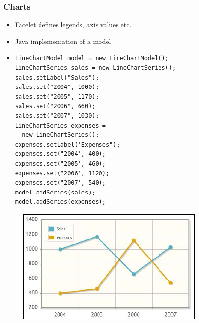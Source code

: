 \documentclass[10pt,xcolor=pdflatex]{beamer}
\begin{document}
\begin{frame}[containsverbatim]\frametitle{Charts}
  \begin{itemize}
    \item Facelet defines legends, axis values etc.
	\item Java implementation of a model
  \end{itemize}
\begin{minipage}{0.5\textwidth}
    \begin{itemize}
        \item[] \begin{scriptsize}
        \begin{verbatim}
LineChartModel model = new LineChartModel();
LineChartSeries sales = new LineChartSeries();
sales.setLabel("Sales");
sales.set("2004", 1000);
sales.set("2005", 1170);
sales.set("2006", 660);
sales.set("2007", 1030);
LineChartSeries expenses = 
  new LineChartSeries();
expenses.setLabel("Expenses");
expenses.set("2004", 400);
expenses.set("2005", 460);
expenses.set("2006", 1120);
expenses.set("2007", 540);
model.addSeries(sales);
model.addSeries(expenses);       
        \end{verbatim}
        \end{scriptsize}
    \end{itemize}
\end{minipage} \hfill
\begin{minipage}{0.43\textwidth}
\begin{figure}[H]
\includegraphics[scale=0.4]{img/obr3}
\end{figure}
\end{minipage}
\end{frame}
\end{document}

